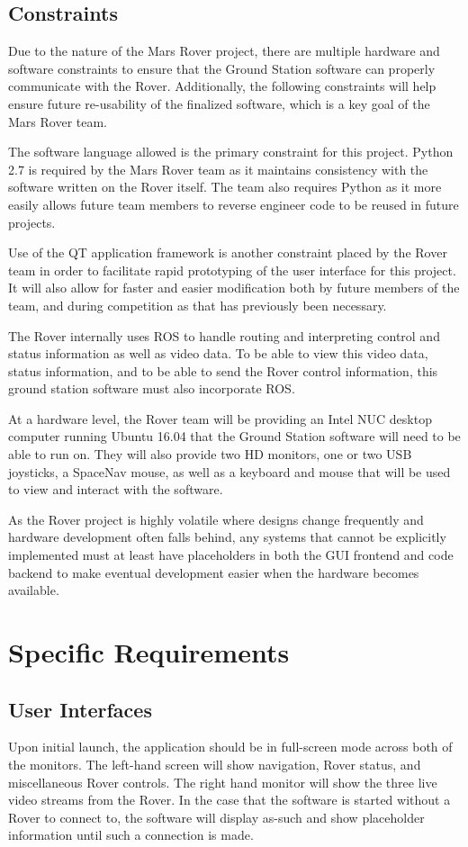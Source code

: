 \documentclass[onecolumn, draftclsnofoot, 10pt, compsoc]{IEEEtran}
\begin{document}
\subsection{Constraints}
Due to the nature of the Mars Rover project, there are multiple hardware and software constraints to ensure that the Ground Station software can properly communicate with the Rover. 
Additionally, the following constraints will help ensure future re-usability of the finalized software, which is a key goal of the Mars Rover team. 
\par
The software language allowed is the primary constraint for this project. 
Python 2.7 is required by the Mars Rover team as it maintains consistency with the software written on the Rover itself. 
The team also requires Python as it more easily allows future team members to reverse engineer code to be reused in future projects.
\par
Use of the QT application framework is another constraint placed by the Rover team in order to facilitate rapid prototyping of the user interface for this project. 
It will also allow for faster and easier modification both by future members of the team, and during competition as that has previously been necessary.
\par
The Rover internally uses ROS to handle routing and interpreting control and status information as well as video data. To be able to view this video data, status information, and to be able to send the Rover control information, this ground station software must also incorporate ROS.
\par
At a hardware level, the Rover team will be providing an Intel NUC desktop computer running Ubuntu 16.04 that the Ground Station software will need to be able to run on.
They will also provide two HD monitors, one or two USB joysticks, a SpaceNav mouse, as well as a keyboard and mouse that will be used to view and interact with the software.
\par
As the Rover project is highly volatile where designs change frequently and hardware development often falls behind, any systems that cannot be explicitly implemented must at least have placeholders in both the GUI frontend and code backend to make eventual development easier when the hardware becomes available.


\section{Specific Requirements}
\subsection{User Interfaces}
Upon initial launch, the application should be in full-screen mode across both of the monitors. 
The left-hand screen will show navigation, Rover status, and miscellaneous Rover controls. 
The right hand monitor will show the three live video streams from the Rover. 
In the case that the software is started without a Rover to connect to, the software will display as-such and show placeholder information until such a connection is made.
\end{document}
